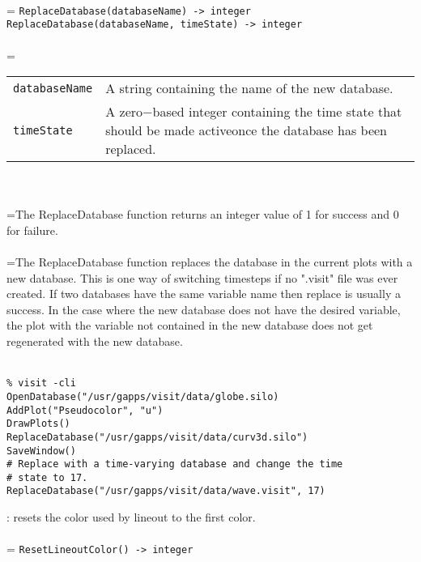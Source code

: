 \documentclass[10pt,a4paper]{report}
\begin{document}
 \\ 
\hangindent=\parindent 
\verb!ReplaceDatabase(databaseName) -> integer!\\ 
\verb!ReplaceDatabase(databaseName, timeState) -> integer!\\ [-3mm]

 \\ 
\hangindent=\parindent 
\begin{tabular}{lp{9cm}}
\verb!databaseName! & A string containing the name of the new database. \\
\verb!timeState! & A zero$-$based integer containing the time state that should be made activeonce the database has been replaced. \\
\end{tabular} \\[-2mm]


 \\ 
\hangindent=\parindent The ReplaceDatabase function returns an integer value of 1 for success and 0 for failure. \\[-3mm] 

 \\ 
\hangindent=\parindent The ReplaceDatabase function replaces the database in the current plots with a new database. This is one way of switching timesteps if no ".visit" file was ever created. If two databases have the same variable name then replace is usually a success. In the case where the new database does not have the desired variable, the plot with the variable not contained in the new database does not get regenerated with the new database. \\[-3mm] 

\\[-6mm]
\begin{verbatim}% visit -cli
OpenDatabase("/usr/gapps/visit/data/globe.silo)
AddPlot("Pseudocolor", "u")
DrawPlots()
ReplaceDatabase("/usr/gapps/visit/data/curv3d.silo")
SaveWindow()
# Replace with a time-varying database and change the time
# state to 17.
ReplaceDatabase("/usr/gapps/visit/data/wave.visit", 17)
\end{verbatim}
\newpage


{}
: resets the color used by lineout to the first color.\\[-3mm]

 \\ 
\hangindent=\parindent 
\verb!ResetLineoutColor() -> integer!\\ [-3mm]
\end{document}
